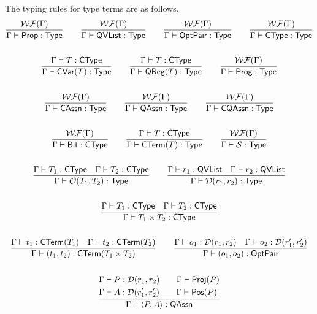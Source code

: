 The typing rules for type terms are as follows.
\begin{gather*}
    \frac{\WF{\Gamma}}{\Gamma \vdash \prop : \Type}
    \qquad
    \frac{\WF{\Gamma}}{\Gamma \vdash \qvlist : \Type}
    \qquad
    \frac{\WF{\Gamma}}{\Gamma \vdash \optpair : \Type}
    \qquad
    \frac{\WF{\Gamma}}{\Gamma \vdash \CType : \Type} \\
    \\
    \frac{\Gamma \vdash T : \CType}{\Gamma \vdash \cvar{T} : \Type}
    \qquad
    \frac{\Gamma \vdash T : \CType}{\Gamma \vdash \qreg{T} : \Type}
    \qquad
    \frac{\WF{\Gamma}}{\Gamma \vdash \prog : \Type} \\
    \\
    \frac{\WF{\Gamma}}{\Gamma \vdash \cAssn : \Type}
    \qquad
    \frac{\WF{\Gamma}}{\Gamma \vdash \qAssn : \Type}
    \qquad
    \frac{\WF{\Gamma}}{\Gamma \vdash \cqAssn : \Type} \\
    \\
    \frac{\WF{\Gamma}}{\Gamma \vdash \bit : \CType}
    \qquad
    \frac{\Gamma \vdash T : \CType}{\Gamma \vdash \CTerm{T} : \Type }
    \qquad
    \frac{\WF{\Gamma}}{\Gamma \vdash \SType : \Type} \\
    \\
    \frac{\Gamma \vdash T_1 : \CType \quad \Gamma \vdash T_2 : \CType}{\Gamma \vdash \opt{T_1}{T_2} : \Type}
    \qquad
    \frac{\Gamma \vdash r_1 : \qvlist \quad \Gamma \vdash r_2 : \qvlist}{\Gamma \vdash \ldirac{r_1}{r_2} : \Type} \\
    \\
    \frac{\Gamma \vdash T_1 : \CType \quad \Gamma \vdash T_2 : \CType}{\Gamma \vdash T_1 \times T_2 : \CType} \\
    \\
    \frac{
    \Gamma \vdash t_1 : \CTerm{T_1} \quad \Gamma \vdash t_2 : \CTerm{T_2}
    }
    {\Gamma \vdash (t_1, t_2) : \CTerm{T_1 \times T_2}}
    \qquad
    \frac{\Gamma \vdash o_1 : \ldirac{r_1}{r_2} \quad \Gamma \vdash o_2 : \ldirac{r_1'}{r_2'}}{\Gamma \vdash (o_1, o_2) : \optpair} \\
    \\
    \frac{
        \begin{aligned}
            & \Gamma \vdash P : \ldirac{r_1}{r_2} \qquad \Gamma \vdash \propproj{P} \\
            & \Gamma \vdash A : \ldirac{r_1'}{r_2'} \qquad \Gamma \vdash \proppos{P}
        \end{aligned}
    }{\Gamma \vdash \abracket{P, A} : \qAssn} \\

\end{gather*}
